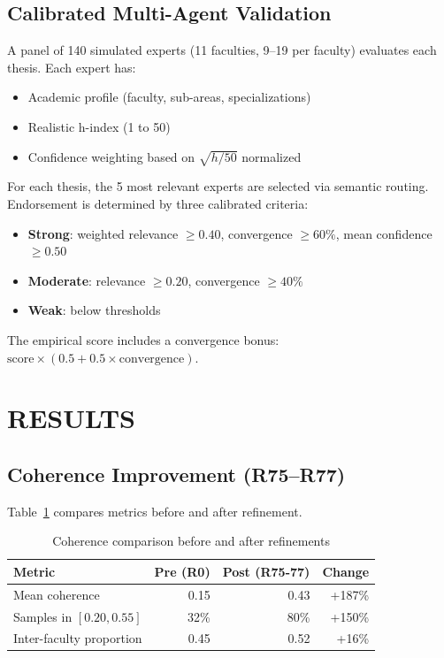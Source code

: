 \documentclass[a4paper,12pt]{article}
\begin{document}
\subsection{Calibrated Multi-Agent Validation}

A panel of 140 simulated experts (11 faculties, 9--19 per faculty) evaluates each thesis. 
Each expert has:
\begin{itemize}
    \item Academic profile (faculty, sub-areas, specializations)
    \item Realistic h-index (1 to 50)
    \item Confidence weighting based on $\sqrt{h/50}$ normalized
\end{itemize}

For each thesis, the 5 most relevant experts are selected via semantic routing. 
Endorsement is determined by three calibrated criteria:

\begin{itemize}
    \item \textbf{Strong}: weighted relevance $\geq 0.40$, convergence $\geq 60\%$, 
          mean confidence $\geq 0.50$
    \item \textbf{Moderate}: relevance $\geq 0.20$, convergence $\geq 40\%$
    \item \textbf{Weak}: below thresholds
\end{itemize}

The empirical score includes a convergence bonus: $\text{score} \times (0.5 + 0.5 \times \text{convergence})$.


\section{RESULTS}\label{sec:results}

\subsection{Coherence Improvement (R75--R77)}

Table~\ref{tab:coherence} compares metrics before and after refinement.

\begin{table}[H]
\centering
\caption{Coherence comparison before and after refinements}
\label{tab:coherence}
\begin{tabular}{lrrr}
\toprule
\textbf{Metric} & \textbf{Pre (R0)} & \textbf{Post (R75-77)} & \textbf{Change} \\
\midrule
Mean coherence & 0.15 & 0.43 & +187\% \\
Samples in $[0.20, 0.55]$ & 32\% & 80\% & +150\% \\
Inter-faculty proportion & 0.45 & 0.52 & +16\% \\
\bottomrule
\end{tabular}
\end{table}
\end{document}
